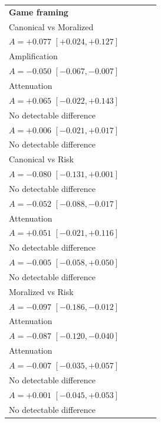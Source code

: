 \begin{table}[t]
\begin{tabular}{lp{3.35cm}p{3.35cm}p{3.35cm}p{3.35cm}}
\multicolumn{5}{l}{\textbf{Game framing}} \\
Canonical vs Moralized & \shortstack{$S_{\mathrm{fixed}}=0.117,\; S_{\mathrm{LLM}}=0.193$\\$A=+0.077$ $[+0.024, +0.127]$\\Amplification} & \shortstack{$S_{\mathrm{fixed}}=0.058,\; S_{\mathrm{LLM}}=0.008$\\$A=-0.050$ $[-0.067, -0.007]$\\Attenuation} & \shortstack{$S_{\mathrm{fixed}}=0.025,\; S_{\mathrm{LLM}}=0.090$\\$A=+0.065$ $[-0.022, +0.143]$\\No detectable difference} & \shortstack{$S_{\mathrm{fixed}}=0.016,\; S_{\mathrm{LLM}}=0.022$\\$A=+0.006$ $[-0.021, +0.017]$\\No detectable difference} \\
Canonical vs Risk & \shortstack{$S_{\mathrm{fixed}}=0.127,\; S_{\mathrm{LLM}}=0.047$\\$A=-0.080$ $[-0.131, +0.001]$\\No detectable difference} & \shortstack{$S_{\mathrm{fixed}}=0.086,\; S_{\mathrm{LLM}}=0.033$\\$A=-0.052$ $[-0.088, -0.017]$\\Attenuation} & \shortstack{$S_{\mathrm{fixed}}=0.024,\; S_{\mathrm{LLM}}=0.075$\\$A=+0.051$ $[-0.021, +0.116]$\\No detectable difference} & \shortstack{$S_{\mathrm{fixed}}=0.072,\; S_{\mathrm{LLM}}=0.067$\\$A=-0.005$ $[-0.058, +0.050]$\\No detectable difference} \\
Moralized vs Risk & \shortstack{$S_{\mathrm{fixed}}=0.243,\; S_{\mathrm{LLM}}=0.147$\\$A=-0.097$ $[-0.186, -0.012]$\\Attenuation} & \shortstack{$S_{\mathrm{fixed}}=0.112,\; S_{\mathrm{LLM}}=0.025$\\$A=-0.087$ $[-0.120, -0.040]$\\Attenuation} & \shortstack{$S_{\mathrm{fixed}}=0.022,\; S_{\mathrm{LLM}}=0.015$\\$A=-0.007$ $[-0.035, +0.057]$\\No detectable difference} & \shortstack{$S_{\mathrm{fixed}}=0.087,\; S_{\mathrm{LLM}}=0.088$\\$A=+0.001$ $[-0.045, +0.053]$\\No detectable difference} \\

\end{tabular}
\end{table}
